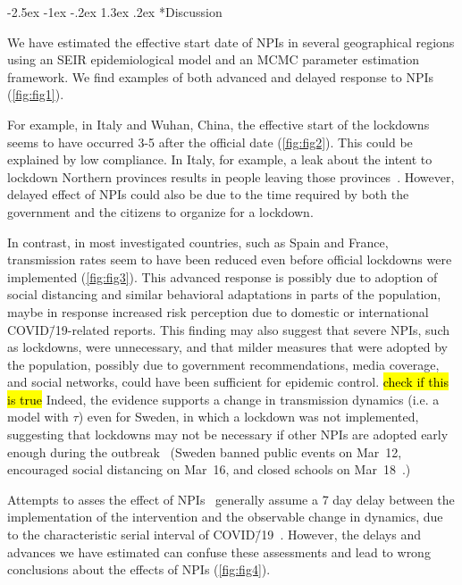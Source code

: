 \documentclass[12pt]{extarticle}
\makeatletter
\renewcommand\section{\@startsection {section}{1}{\z@}%
     {-2.5ex \@plus -1ex \@minus -.2ex}%
     {1.3ex \@plus.2ex}%
    {\Large\bfseries}}
\makeatother
\begin{document}
\pagebreak
\section*{Discussion}

We have estimated the effective start date of NPIs in several geographical regions using an SEIR epidemiological model and an MCMC parameter estimation framework.
We find examples of both advanced and delayed response to NPIs (\autoref{fig:fig1}).

For example, in Italy and Wuhan, China, the effective start of the lockdowns seems to have occurred 3-5 after the official date (\autoref{fig:fig2}). This could be explained by low compliance. In Italy, for example, a leak about the intent to lockdown Northern provinces results in people leaving those provinces~\citep{Gatto2020}. However, delayed effect of NPIs could also be due to the time required by both the government and the citizens to organize for a lockdown. 
 
In contrast, in most investigated countries, such as Spain and France, transmission rates seem to have been reduced even before official lockdowns were implemented (\autoref{fig:fig3}).
This advanced response is possibly due to adoption of social distancing and similar behavioral adaptations in parts of the population, maybe in response increased risk perception due to domestic or international COVID\=/19-related reports.
This finding may also suggest that severe NPIs, such as lockdowns, were unnecessary, and that milder measures that were adopted by the population, possibly due to government recommendations, media coverage, and social networks, could have been sufficient for epidemic control.
\hl{check if this is true} Indeed, the evidence supports a change in transmission dynamics (i.e. a model with $\tau$) even for Sweden, in which a lockdown was not implemented, suggesting that lockdowns may not be necessary if other NPIs are adopted early enough during the outbreak~\citep{Banholzer2020} (Sweden banned public events on Mar~12, encouraged social distancing on Mar~16, and closed schools on Mar~18~\citep{Flaxman2020}.)

Attempts to asses the effect of NPIs~\citep{Flaxman2020,Banholzer2020} generally assume a 7 day delay between the implementation of the intervention and the observable change in dynamics, due to the characteristic serial interval of COVID\=/19~\citep{Gatto2020}.
However, the delays and advances we have estimated can confuse these assessments and lead to wrong conclusions about the effects of NPIs (\autoref{fig:fig4}). 
\end{document}
